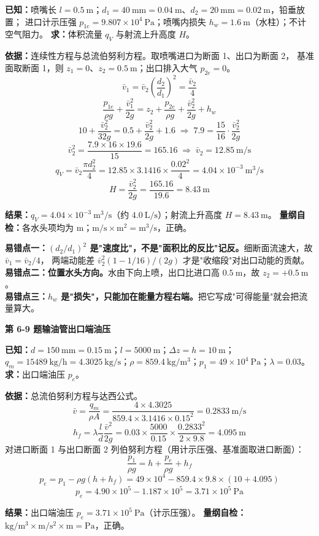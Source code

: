 \begin{jie}
\textbf{已知：}喷嘴长 $l=0.5\ \mathrm{m}$；$d_1=40\ \mathrm{mm}=0.04\ \mathrm{m}$、$d_2=20\ \mathrm{mm}=0.02\ \mathrm{m}$，铅垂放置；
进口计示压强 $p_{1e}=9.807\times10^4\ \mathrm{Pa}$；喷嘴内损失 $h_w=1.6\ \mathrm{m}$（水柱）；不计空气阻力。
\textbf{求：}体积流量 $q_V$ 与射流上升高度 $H$。

\textbf{依据：}连续性方程与总流伯努利方程。取喷嘴进口为断面 1、出口为断面 2，
基准面取断面 1，则 $z_1=0$、$z_2=0.5\ \mathrm{m}$；出口排入大气 $p_{2e}=0$。
\[ \bar v_1=\bar v_2\left(\frac{d_2}{d_1}\right)^2=\frac{\bar v_2}{4} \]
\[ \frac{p_{1e}}{\rho g}+\frac{\bar v_1^2}{2g}=z_2+\frac{p_{2e}}{\rho g}+\frac{\bar v_2^2}{2g}+h_w \]
\[ 10+\frac{\bar v_2^2}{32g}=0.5+\frac{\bar v_2^2}{2g}+1.6
\;\Longrightarrow\;7.9=\frac{15}{16}\cdot\frac{\bar v_2^2}{2g} \]
\[ \bar v_2^2=\frac{7.9\times16\times19.6}{15}=165.16\;\Longrightarrow\;\bar v_2=12.85\ \mathrm{m/s} \]
\[ q_V=\bar v_2\frac{\pi d_2^2}{4}=12.85\times3.1416\times\frac{0.02^2}{4}=4.04\times10^{-3}\ \mathrm{m^3/s} \]
\[ H=\frac{\bar v_2^2}{2g}=\frac{165.16}{19.6}=8.43\ \mathrm{m} \]

\textbf{结果：}$q_V=4.04\times10^{-3}\ \mathrm{m^3/s}$（约 $4.0\ \mathrm{L/s}$）；射流上升高度 $H=8.43\ \mathrm{m}$。
\textbf{量纲自检：}各水头项均为 $\mathrm{m}$；$\mathrm{m/s\times m^2}=\mathrm{m^3/s}$，正确。
\end{jie}

\begin{yicuo}
\textbf{易错点一：$(d_2/d_1)^2$ 是"速度比"，不是"面积比的反比"记反。}细断面流速大，故 $\bar v_1=\bar v_2/4$，
两端动能差 $\bar v_2^2(1-1/16)/(2g)$ 才是"收缩段"对出口动能的贡献。\\
\textbf{易错点二：位置水头方向。}水由下向上喷，出口比进口高 $0.5\ \mathrm{m}$，故 $z_2=+0.5\ \mathrm{m}$。\\
\textbf{易错点三：$h_w$ 是"损失"，只能加在能量方程右端。}把它写成"可得能量"就会把流量算大。
\end{yicuo}

\noindent\textbf{第 6-9 题\quad 输油管出口端油压}

\begin{jie}
\textbf{已知：}$d=150\ \mathrm{mm}=0.15\ \mathrm{m}$；$l=5000\ \mathrm{m}$；$\Delta z=h=10\ \mathrm{m}$；
$q_m=15489\ \mathrm{kg/h}=4.3025\ \mathrm{kg/s}$；$\rho=859.4\ \mathrm{kg/m^3}$；$p_1=49\times10^4\ \mathrm{Pa}$；$\lambda=0.03$。
\textbf{求：}出口端油压 $p_e$。

\textbf{依据：}总流伯努利方程与达西公式。
\[ \bar v=\frac{q_m}{\rho A}=\frac{4\times4.3025}{859.4\times3.1416\times0.15^2}=0.2833\ \mathrm{m/s} \]
\[ h_f=\lambda\frac ld\frac{\bar v^2}{2g}=0.03\times\frac{5000}{0.15}\times\frac{0.2833^2}{2\times9.8}=4.095\ \mathrm{m} \]
对进口断面 1 与出口断面 2 列伯努利方程（用计示压强、基准面取进口断面）：
\[ \frac{p_1}{\rho g}=h+\frac{p_e}{\rho g}+h_f \]
\[ p_e=p_1-\rho g(h+h_f)=49\times10^4-859.4\times9.8\times(10+4.095) \]
\[ p_e=4.90\times10^5-1.187\times10^5=3.71\times10^5\ \mathrm{Pa} \]

\textbf{结果：}出口端油压 $p_e=3.71\times10^5\ \mathrm{Pa}$（计示压强）。
\textbf{量纲自检：}$\mathrm{kg/m^3\times m/s^2\times m}=\mathrm{Pa}$，正确。
\end{jie}


